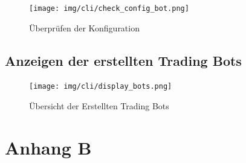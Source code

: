 \documentclass[oneside]{ausarbeitung}
\begin{document}
\begin{figure}[H]
  \centering
  \texttt{[image: img/cli/check\_config\_bot.png]}
  \caption{Überprüfen der Konfiguration}
  \label{fig:}
\end{figure}

\section{Anzeigen der erstellten Trading Bots}
\label{sec:anzeigen_der_erstellten_trading_bots}

\begin{figure}[H]
  \centering
  \texttt{[image: img/cli/display\_bots.png]}
  \caption{Übersicht der Erstellten Trading Bots}
  \label{fig:}
\end{figure}

\chapter{Anhang B}
\end{document}
